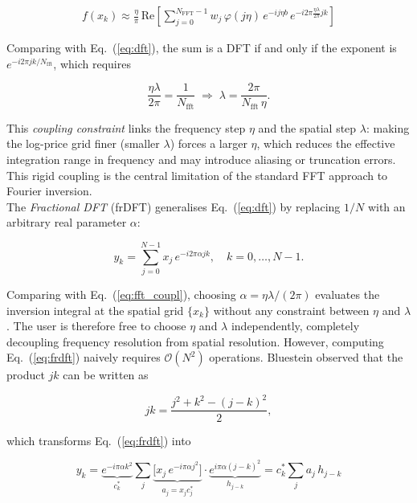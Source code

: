 \begin{align}
    f(x_k) \approx \frac{\eta}{\pi}\,\mathrm{Re} \left[\sum_{j=0}^{N_{\mathrm{FFT}}-1}w_j\,\varphi(j\eta)\,e^{-ij\eta b}\,e^{-i2\pi\frac{\eta\lambda}{2\pi}jk}\right]
    \label{eq:fft_coupl}
\end{align}

Comparing with Eq.~(\ref{eq:dft}), the sum is a DFT if and only if the exponent is $e^{-i2\pi jk/N_\text{fft}}$, which requires

\begin{equation}
    \frac{\eta\lambda}{2\pi} = \frac{1}{N_\text{fft}} \;\Longrightarrow\; \lambda = \frac{2\pi}{N_\text{fft}\,\eta}.
    \label{eq:std_fft_constraint}
\end{equation}

This \textit{coupling constraint} links the frequency step $\eta$ and the spatial step $\lambda$: making the log-price grid finer (smaller $\lambda$) forces a larger $\eta$, which reduces the effective integration range in frequency and may introduce aliasing or truncation errors. This rigid coupling is the central limitation of the standard FFT approach to Fourier inversion.\\

The \textit{Fractional DFT} (frDFT) generalises Eq.~(\ref{eq:dft}) by replacing $1/N$ with an arbitrary real parameter $\alpha$:

\begin{equation}
    y_k = \sum_{j=0}^{N-1} x_j\, e^{-i2\pi\alpha jk}, \quad k = 0, \ldots, N-1.
    \label{eq:frdft}
\end{equation}

Comparing with Eq.~(\ref{eq:fft_coupl}), choosing $\alpha = \eta\lambda/(2\pi)$ evaluates the inversion integral at the spatial grid $\{x_k\}$ without any constraint between $\eta$ and $\lambda$. The user is therefore free to choose $\eta$ and $\lambda$ independently, completely decoupling frequency resolution from spatial resolution.
However, computing Eq.~(\ref{eq:frdft}) naively requires $\mathcal{O}(N^2)$ operations. 
Bluestein observed that the product $jk$ can be written as

\begin{equation}
    jk = \frac{j^2 + k^2 - (j-k)^2}{2},
    \label{eq:bluestein_id}
\end{equation}

which transforms Eq.~(\ref{eq:frdft}) into

\begin{equation}
    y_k = \underbrace{e^{-i\pi\alpha k^2}}_{c_k^*}\sum_j \underbrace{\bigl[x_j\, e^{-i\pi\alpha j^2}\bigr]}_{a_j = x_j c_j^*} \cdot \underbrace{e^{i\pi\alpha(j-k)^2}}_{h_{j-k}}= c_k^* \sum_j a_j\, h_{j-k}
    \label{eq:bluestein_conv}
\end{equation}

